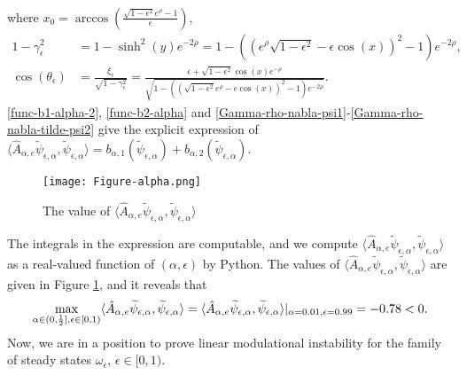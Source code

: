 \documentclass[1 [leqno, 11pt]{amsart}
\numberwithin{equation}{section}
\let\ep=\epsilon
\def\gep{\gamma_\epsilon}
\begin{document}
\begin{CJK*}{GBK}{song}
\begin{align}
\end{align}
where $x_0 = \arccos\left( \frac{\sqrt{1-\ep^2} e^\rho - 1}{\ep} \right)$,
\begin{align}\nonumber
1-\gamma_\ep^2&=1-\sinh^2(y)e^{-2\rho}=1-\left((e^\rho \sqrt{1-\ep^2}-\ep \cos(x))^2-1\right)e^{-2\rho},\\\label{1-gamma-ep-2-expression}
\cos(\theta_\ep) &= \frac{\xi_\ep}{\sqrt{1-\gep^2}} = \frac{\ep + \sqrt{1-\ep^2} \cos(x) e^{-\rho} }{\sqrt{1 - \left(\left( \sqrt{1-\ep^2} e^{\rho} - \ep \cos(x) \right)^2 - 1\right) e^{-2\rho}}}.
\end{align}
 \eqref{func-b1-alpha-2}, \eqref{func-b2-alpha} and \eqref{Gamma-rho-nabla-psi1}-\eqref{Gamma-rho-nabla-tilde-psi2} give the explicit expression of $\langle\hat{A}_{\alpha,e} \widetilde\psi_{\ep,\alpha}, \widetilde\psi_{\ep,\alpha} \rangle=  b_{\alpha, 1}(\widetilde\psi_{\ep,\alpha}) + b_{\alpha, 2}(\widetilde\psi_{\ep,\alpha})$.
 \begin{figure}[ht]
    \centering
	\texttt{[image: Figure-alpha.png]}
	\caption{The value of $\langle\hat{A}_{\alpha,e} \widetilde\psi_{\ep,\alpha}, \widetilde\psi_{\ep,\alpha} \rangle$}
	\label{fig:3rdFig}
\end{figure}
 The integrals in the expression are computable, and  we compute $\langle\hat{A}_{\alpha,e} \widetilde\psi_{\ep,\alpha}, \widetilde\psi_{\ep,\alpha} \rangle$ as a real-valued function of $(\alpha,\epsilon)$ by Python.
The values of  $\langle\hat{A}_{\alpha,e} \widetilde\psi_{\ep,\alpha}, \widetilde\psi_{\ep,\alpha} \rangle$ are given in Figure \ref{fig:3rdFig}, and it reveals
 that
 \begin{align}\label{test-function-modulational-instability-quadratic form}
 \max_{\alpha\in(0,{1\over2}],\ep\in[0,1)}\langle\hat{A}_{\alpha,e} \widetilde\psi_{\ep,\alpha}, \widetilde\psi_{\ep,\alpha} \rangle=\langle\hat{A}_{\alpha,e} \widetilde\psi_{\ep,\alpha}, \widetilde\psi_{\ep,\alpha} \rangle|_{\alpha=0.01,\ep=0.99}=-0.78<0.
 \end{align}
Now, we are in a position to prove linear modulational instability for the family of steady states $\omega_\ep$, $\ep\in[0,1)$.


\end{CJK*}
\end{document}

